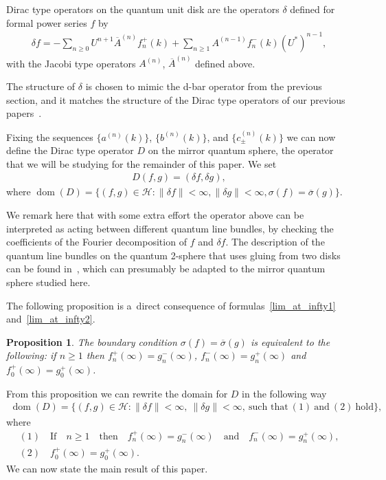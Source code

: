 \documentclass[11pt]{article}
\numberwithin{equation}{section}
\newtheorem{prop}[theo]{Proposition}
{\theoremstyle{definition}
\newtheorem{rem}[theo]{Remark}
\newtheorem{defin}[theo]{Definition}
}
\DeclareMathOperator{\dom}{dom}
\begin{document}
\begin{defin}
Dirac type operators on the quantum unit disk are the operators $\delta$ def\/ined for formal power series $f$ by
\begin{gather}
\label{quantDTO}
\delta f = -\sum\limits_{n\ge0} U^{n+1} \overline{A}^{(n)}f_n^+(k) + \sum\limits_{n\ge1} A^{(n-1)}f_n^-(k)(U^*)^{n-1},
\end{gather}
with the Jacobi type operators $A^{(n)}$, $\overline {A}^{(n)}$ def\/ined above.
\end{defin}

The structure of $\delta$ is chosen to mimic the d-bar operator from the previous section, and it matches the structure
of the Dirac type operators of our previous papers~\cite{CKW,KM1,KM2,KM4,KM5}.

Fixing the sequences $\{a^{(n)}(k)\}$, $\{b^{(n)}(k)\}$, and $\{c_{\pm}^{(n)}(k)\}$ we can now def\/ine the Dirac type
operator $D$ on the mirror quantum sphere, the operator that we will be studying for the remainder of this paper.
We set
\begin{gather}
\label{quant_dirac_op}
D(f,g) = (\delta f, \delta g),
\end{gather}
where $\dom(D) = \{ (f,g)\in\mathcal{H}: \|\delta f\|<\infty, \|\delta g\|<\infty,\sigma(f) =
\overline{\sigma}(g)\}$.

We remark here that with some extra ef\/fort the operator above can be interpreted as acting between dif\/ferent quantum
line bundles, by checking the coef\/f\/icients of the Fourier decomposition of $f$ and $\delta f$.
The description of the quantum line bundles on the quantum 2-sphere that uses gluing from two disks can be found
in~\cite{Wagner}, which can presumably be adapted to the mirror quantum sphere studied here.

The following proposition is a~direct consequence of formulas~\eqref{lim_at_infty1} and~\eqref{lim_at_infty2}.

\begin{prop}
\label{bndy_cond_quant}
The boundary condition $ \sigma(f) = \overline{\sigma}(g)$ is equivalent to the following: if $n\ge 1$ then
$f_n^+(\infty) = g_n^-(\infty)$,
$f_n^-(\infty) = g_n^+(\infty)$ and $f_0^+(\infty) = g_0^+(\infty)$.
\end{prop}

From this proposition we can rewrite the domain for $D$ in the following way
\begin{gather*}
\dom(D) = \{(f,g)\in\mathcal{H}: \|\delta f\|<\infty,~\|\delta g\|<\infty,~\text{such that}~(1)~\text{and}~(2)~\text{hold}\},
\end{gather*}
where
\begin{gather*}
(1)\quad\text{If}\quad n\ge 1 \quad\text{then}\quad  f_n^+(\infty) = g_n^-(\infty)\quad\text{and}\quad  f_n^-(\infty) = g_n^+(\infty),
\\
(2)\quad f_0^+(\infty) = g_0^+(\infty).
\end{gather*}
We can now state the main result of this paper.
\end{document}
